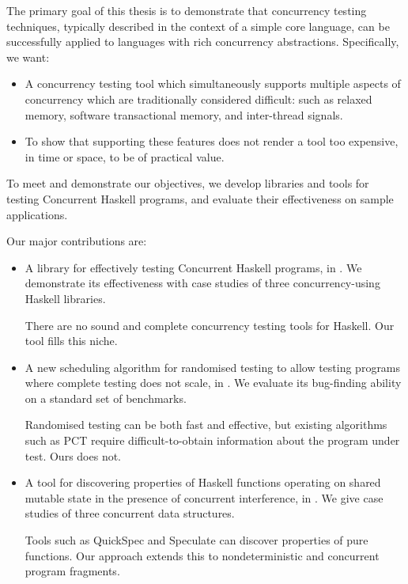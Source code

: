 The primary goal of this thesis is to demonstrate that concurrency
testing techniques, typically described in the context of a simple
core language, can be successfully applied to languages with rich
concurrency abstractions.  Specifically, we want:

\begin{itemize}
\item A concurrency testing tool which simultaneously supports
  multiple aspects of concurrency which are traditionally considered
  difficult: such as relaxed memory, software transactional memory,
  and inter-thread signals.
\item To show that supporting these features does not render a tool
  too expensive, in time or space, to be of practical value.
\end{itemize}

To meet and demonstrate our objectives, we develop libraries and tools
for testing Concurrent Haskell programs, and evaluate their
effectiveness on sample applications.

Our major contributions are:

\begin{itemize}
\item A library for effectively testing Concurrent Haskell programs,
  in .  We demonstrate its effectiveness with case
  studies of three concurrency-using Haskell libraries.

  There are no sound and complete concurrency testing tools for
  Haskell.  Our tool fills this niche.
\item A new scheduling algorithm for randomised testing to allow
  testing programs where complete testing does not scale, in
  .  We evaluate its bug-finding ability on a
  standard set of benchmarks.

  Randomised testing can be both fast and effective, but existing
  algorithms such as PCT \parencite{burckhardt2010} require
  difficult-to-obtain information about the program under test.  Ours
  does not.
\item A tool for discovering properties of Haskell functions operating
  on shared mutable state in the presence of concurrent interference,
  in .  We give case studies of three concurrent data
  structures.

  Tools such as QuickSpec \parencite{smallbone2017} and Speculate
  \parencite{braquehais2017} can discover properties of pure
  functions.  Our approach extends this to nondeterministic and
  concurrent program fragments.
\end{itemize}

